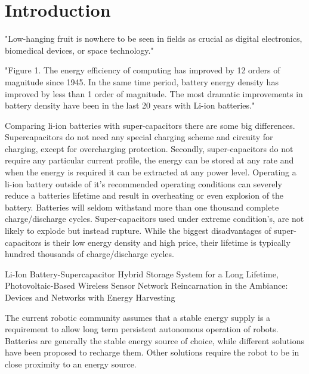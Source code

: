 \chapter{Introduction}
\label{chp:introduction}




"Low-hanging fruit is nowhere to be seen in fields as crucial as digital electronics, biomedical devices, or space technology."
\cite{zachary_spec_2016}

"Figure 1. The energy efficiency of computing has improved by 12 orders of magnitude since 1945. In the same time period, battery energy density has improved by less than 1 order of magnitude. The most dramatic improvements in battery density have been in the last 20 years with Li-ion batteries."
\cite{patel_pvc_2017}

Comparing li-ion batteries with super-capacitors there are some big differences.
Supercapacitors do not need any special charging scheme and circuity for charging, except for overcharging protection.
Secondly, super-capacitors do not require any particular current profile, the energy can be stored at any rate and when the energy is required it can be extracted at any power level.
Operating a li-ion battery outside of it's recommended operating conditions can severely reduce a batteries lifetime and result in overheating or even explosion of the battery.
Batteries will seldom withstand more than one thousand complete charge/discharge cycles.
Super-capacitors used under extreme condition's, are not likely to explode but instead rupture.
While the biggest disadvantages of super-capacitors is their low energy density and high price, their lifetime is typically hundred thousands of charge/discharge cycles.

Li-Ion Battery-Supercapacitor Hybrid Storage System for a Long Lifetime, Photovoltaic-Based Wireless Sensor Network	\cite{ongaro_pwre_2012}
Reincarnation in the Ambiance: Devices and Networks with Energy Harvesting \cite{prasad_comst_2014}


The current robotic community assumes that a stable energy supply is a requirement to allow long term persistent autonomous operation of robots.
Batteries are generally the stable energy source of choice, while different solutions have been proposed to recharge them.
Other solutions require the robot to be in close proximity to an energy source.

